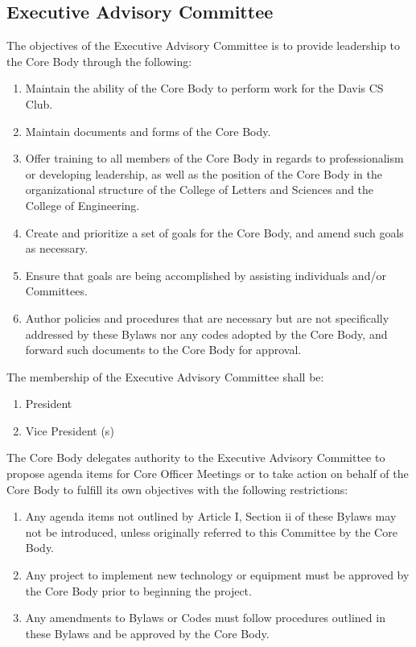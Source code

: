 \documentclass{article}
\newenvironment{li}{
\begin{enumerate}
  \setlength{\itemsep}{1pt}
  \setlength{\parskip}{0pt}
  \setlength{\parsep}{0pt}
}{\end{enumerate}}
\begin{document}
\subsection{Executive Advisory Committee}
The objectives of the Executive Advisory Committee is to provide leadership to the Core Body through the following:
\begin{li}
\item Maintain the ability of the Core Body to perform work for the Davis CS Club.
\item Maintain documents and forms of the Core Body.
\item Offer training to all members of the Core Body in regards to professionalism or developing leadership, as well as the position of the Core Body in the organizational structure of the College of Letters and Sciences and the College of Engineering.
\item Create and prioritize a set of goals for the Core Body, and amend such goals as necessary.
\item Ensure that goals are being accomplished by assisting individuals and/or Committees.
\item Author policies and procedures that are necessary but are not specifically addressed by these Bylaws nor any codes adopted by the Core Body, and forward such documents to the Core Body for approval.
\end{li}

\noindent The membership of the Executive Advisory Committee shall be:
\begin{li}
\item President
\item Vice President (s)
\end{li}

\noindent The Core Body delegates authority to the Executive Advisory Committee to propose agenda items for Core Officer Meetings or to take action on behalf of the Core Body to fulfill its own objectives with the following restrictions:
\begin{li}
\item Any agenda items not outlined by Article I, Section ii of these Bylaws may not be introduced, unless originally referred to this Committee by the Core Body.
\item Any project to implement new technology or equipment must be approved by the Core Body prior to beginning the project.
\item Any amendments to Bylaws or Codes must follow procedures outlined in these Bylaws and be approved by the Core Body.
\end{li}
\end{document}
